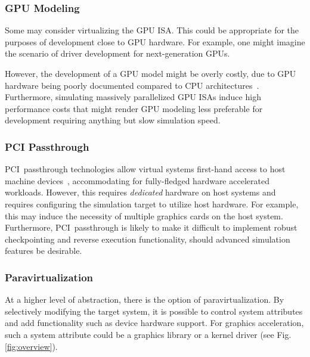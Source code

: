 \subsubsection{GPU Modeling}
\label{par:previousresearch_graphicsvirtualization_gpumodeling}
Some may consider virtualizing the GPU ISA.
This could be appropriate for the purposes of development close to GPU hardware.
For example, one might imagine the scenario of driver development for next-generation GPUs.

However, the development of a GPU model might be overly costly, due to GPU hardware being poorly documented compared to CPU architectures~.
Furthermore, simulating massively parallelized GPU ISAs induce high performance costs that might render GPU modeling less preferable for development requiring anything but slow simulation speed.

\subsubsection{PCI Passthrough}
\label{par:previousresearch_graphicsvirtualization_pcipassthrough}
PCI~passthrough technologies allow virtual systems first-hand access to host machine devices~, accommodating for fully-fledged hardware accelerated workloads.
However, this requires \textit{dedicated} hardware on host systems and requires configuring the simulation target to utilize host hardware.
For example, this may induce the necessity of multiple graphics cards on the host system.
Furthermore, PCI~passthrough is likely to make it difficult to implement robust checkpointing and reverse execution functionality, should advanced simulation features be desirable.

\subsubsection{Paravirtualization}
\label{par:previousresearch_graphicsvirtualization_paravirtualization}
At a higher level of abstraction, there is the option of paravirtualization.
By selectively modifying the target system, it is possible to control system attributes and add functionality such as device hardware support.
For graphics acceleration, such a system attribute could be a graphics library or a kernel driver (see Fig. \ref{fig:overview}).

